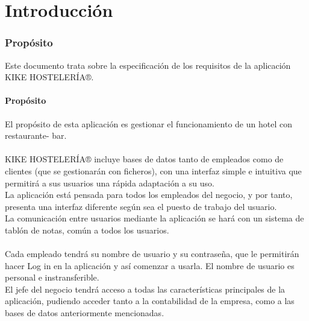 \documentclass[spanish,a4paper,11pt, twoside]{report}	%
\begin{document}
\newpage
\mbox{}
\thispagestyle{empty}						%
\newpage


\tableofcontents 							%

\newpage
\mbox{}
\thispagestyle{empty}						%
\newpage


\part{Introducción}
\section{Propósito}
 	Este documento trata sobre la especificación de los requisitos de la aplicación KIKE HOSTELERÍA®.
		\subsection{Propósito} El propósito de esta aplicación es gestionar el funcionamiento de un hotel con restaurante- bar. \\\\
KIKE HOSTELERÍA® incluye bases de datos tanto de empleados como de clientes (que se gestionarán con ficheros), con una interfaz simple e intuitiva que permitirá a sus usuarios una rápida adaptación a su uso.\\

La aplicación está pensada para todos los empleados del negocio, y por tanto, presenta una interfaz diferente según sea el puesto de trabajo del usuario.\\

La comunicación entre usuarios mediante la aplicación se hará con un sistema de tablón de notas, común a todos los usuarios.\\\\
Cada empleado tendrá su nombre de usuario y su contraseña, que le permitirán hacer Log in en la aplicación y así comenzar a usarla. El nombre de usuario es personal e instransferible.\\

El jefe del negocio tendrá acceso a todas las características principales de la aplicación, pudiendo acceder tanto a la contabilidad de la empresa, como a las bases de datos anteriormente mencionadas. \\
\end{document}
